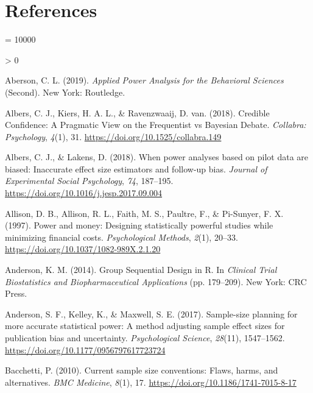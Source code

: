 \documentclass[
  english,
  ,jou, a4paper,floatsintext]{apa6}
\newlength{\cslhangindent}
\newenvironment{CSLReferences}[2] %
 {%
  \setlength{\parindent}{0pt}
  \ifodd #1 \everypar{\setlength{\hangindent}{\cslhangindent}}\ignorespaces\fi
  \ifnum #2 > 0
  \setlength{\parskip}{#2\baselineskip}
  \fi
 }%
 {}
\begin{document}
\hypertarget{references}{%
\section{References}\label{references}}

\begingroup

\interlinepenalty = 10000

\hypertarget{refs}{}
\begin{CSLReferences}{1}{0}
\leavevmode\hypertarget{ref-aberson_applied_2019}{}%
Aberson, C. L. (2019). \emph{Applied {Power Analysis} for the {Behavioral Sciences}} (Second). {New York}: {Routledge}.

\leavevmode\hypertarget{ref-albers_credible_2018}{}%
Albers, C. J., Kiers, H. A. L., \& Ravenzwaaij, D. van. (2018). Credible {Confidence}: A {Pragmatic View} on the {Frequentist} vs {Bayesian Debate}. \emph{Collabra: Psychology}, \emph{4}(1), 31. \url{https://doi.org/10.1525/collabra.149}

\leavevmode\hypertarget{ref-albers_when_2018}{}%
Albers, C. J., \& Lakens, D. (2018). When power analyses based on pilot data are biased: Inaccurate effect size estimators and follow-up bias. \emph{Journal of Experimental Social Psychology}, \emph{74}, 187--195. \url{https://doi.org/10.1016/j.jesp.2017.09.004}

\leavevmode\hypertarget{ref-allison_power_1997}{}%
Allison, D. B., Allison, R. L., Faith, M. S., Paultre, F., \& Pi-Sunyer, F. X. (1997). Power and money: Designing statistically powerful studies while minimizing financial costs. \emph{Psychological Methods}, \emph{2}(1), 20--33. \url{https://doi.org/10.1037/1082-989X.2.1.20}

\leavevmode\hypertarget{ref-anderson_group_2014}{}%
Anderson, K. M. (2014). Group {Sequential Design} in {R}. In \emph{Clinical {Trial Biostatistics} and {Biopharmaceutical Applications}} (pp. 179--209). {New York}: {CRC Press}.

\leavevmode\hypertarget{ref-anderson_sample-size_2017}{}%
Anderson, S. F., Kelley, K., \& Maxwell, S. E. (2017). Sample-size planning for more accurate statistical power: A method adjusting sample effect sizes for publication bias and uncertainty. \emph{Psychological Science}, \emph{28}(11), 1547--1562. \url{https://doi.org/10.1177/0956797617723724}

\leavevmode\hypertarget{ref-bacchetti_current_2010}{}%
Bacchetti, P. (2010). Current sample size conventions: Flaws, harms, and alternatives. \emph{BMC Medicine}, \emph{8}(1), 17. \url{https://doi.org/10.1186/1741-7015-8-17}


\end{CSLReferences}
\end{document}
